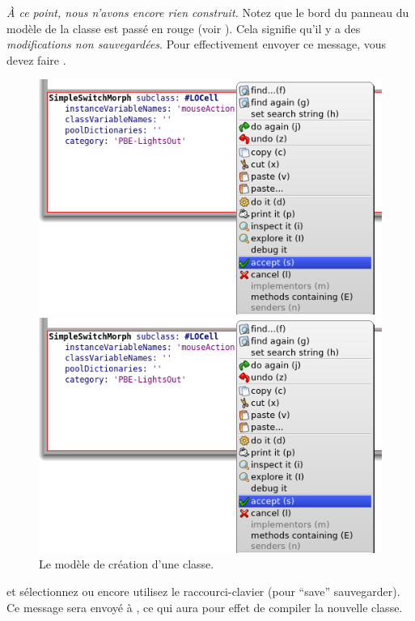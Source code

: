 \documentclass[a4paper,10pt,twoside]{book}
\begin{document}
\emph{À ce point, nous n'avons encore rien construit.}
Notez que le bord du panneau du modèle de la classe est passé en rouge
(voir ).
Cela signifie qu'il y a des \emph{modifications non sauvegardées}.
Pour effectivement envoyer ce message, vous devez faire .

\begin{figure}[h!t]
\ifluluelse
	{\centerline {\includegraphics[width=\textwidth]{AcceptClassDef}}}
	{\centerline {\includegraphics[scale=0.7]{AcceptClassDef}}}
\caption{Le modèle de création d'une classe.
}
\end{figure}

\Actclickz{} et sélectionnez  ou encore utilisez le
raccourci-clavier  (pour
``save'' 
\cad sauvegarder).
Ce message sera envoyé à , ce qui aura pour
effet de compiler la nouvelle classe.
\end{document}
